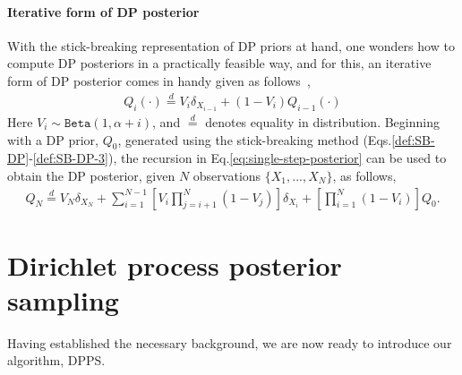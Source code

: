 \documentclass[10pt]{article}
\begin{document}
\paragraph{Iterative form of DP posterior} With the stick-breaking representation of DP priors at hand, one wonders how to compute DP posteriors in a practically feasible way, and for this, an iterative form of DP posterior comes in handy  given as follows~\citep{blackwell1973ferguson,sethuraman1994constructive},
\begin{align}\label{eq:single-step-posterior}
Q_{i}(\cdot) \stackrel{d}{=} V_{i}\delta_{X_{i-1}} + (1-V_{i})Q_{i-1}(\cdot)
\end{align}
Here $V_{i} \sim \texttt{Beta}(1,\alpha + i)$, and $\stackrel{d}{=}$ denotes equality in distribution.  Beginning with a DP prior, $Q_{0}$, generated using the stick-breaking method (Eqs.\ref{def:SB-DP}-\ref{def:SB-DP-3}),
the recursion in Eq.\ref{eq:single-step-posterior} can be used to obtain the  DP posterior, given $N$ observations $\{X_{1},. . ., X_{N}\}$, as follows,
\begin{align}
\label{eq:multi-step-posterior}
Q_{N} \stackrel{d}{=} V_{N}\delta_{X_{N}} + \sum_{i=1}^{N-1}\left[V_{i}\prod_{j=i+1}^{N}(1-V_{j})\right]\delta_{X_{i}}  + \left[\prod_{i=1}^{N}(1-V_{i})\right] Q_{0}.
\end{align}


\section{Dirichlet process posterior sampling} \label{sec:DPPS}

Having established the necessary background, we are now ready to introduce our algorithm, DPPS.  
\end{document}
